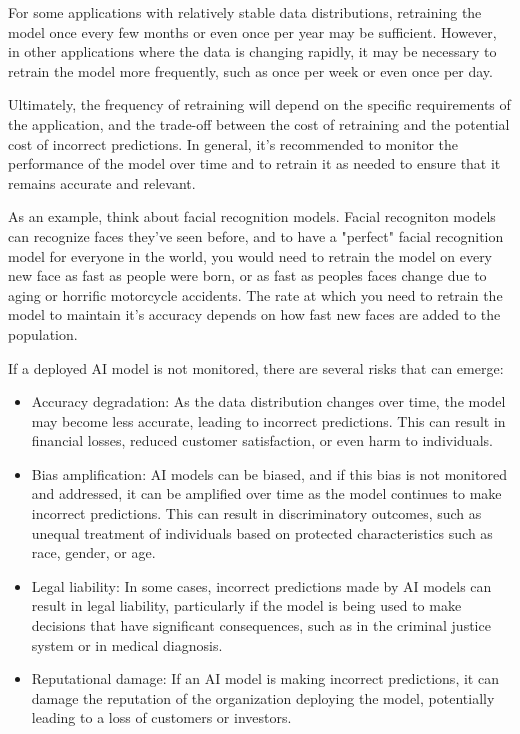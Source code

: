 For some applications with relatively stable data distributions, retraining the model once every few months or even once per year may be sufficient. However, in other applications where the data is changing rapidly, it may be necessary to retrain the model more frequently, such as once per week or even once per day.

Ultimately, the frequency of retraining will depend on the specific requirements of the application, and the trade-off between the cost of retraining and the potential cost of incorrect predictions. In general, it's recommended to monitor the performance of the model over time and to retrain it as needed to ensure that it remains accurate and relevant.

As an example, think about facial recognition models. Facial recogniton models can recognize faces they've seen before, and to have a "perfect" facial recognition model for everyone in the world, you would need to retrain the model on every new face as fast as people were born, or as fast as peoples faces change due to aging or horrific motorcycle accidents. The rate at which you need to retrain the model to maintain it's accuracy depends on how fast new faces are added to the population.

If a deployed AI model is not monitored, there are several risks that can emerge:

\begin{itemize}
\item Accuracy degradation: As the data distribution changes over time, the model may become less accurate, leading to incorrect predictions. This can result in financial losses, reduced customer satisfaction, or even harm to individuals.
\item Bias amplification: AI models can be biased, and if this bias is not monitored and addressed, it can be amplified over time as the model continues to make incorrect predictions. This can result in discriminatory outcomes, such as unequal treatment of individuals based on protected characteristics such as race, gender, or age.
\item Legal liability: In some cases, incorrect predictions made by AI models can result in legal liability, particularly if the model is being used to make decisions that have significant consequences, such as in the criminal justice system or in medical diagnosis.
\item Reputational damage: If an AI model is making incorrect predictions, it can damage the reputation of the organization deploying the model, potentially leading to a loss of customers or investors.
\end{itemize}

